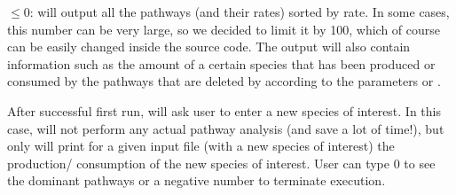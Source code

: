 $\leq 0$: \pump{} will output all the pathways (and their rates) sorted by rate. In some cases, this number can be very large, so we decided to limit it by 100, which of course can be easily changed inside the \pump{} source code. The output will also contain information such as the amount of a certain species that has been produced or consumed by the pathways that are deleted by \pump{} according to the parameters  or . 

After successful first run, \pump{} will ask user to enter a new species of interest. In this case, \pump{} will not perform any actual pathway analysis (and save a lot of time!), but only will print for a given input file (with a new species of interest) the production/ consumption of the new species of interest. User can type 0 to see the dominant pathways or a negative number to terminate execution.     













